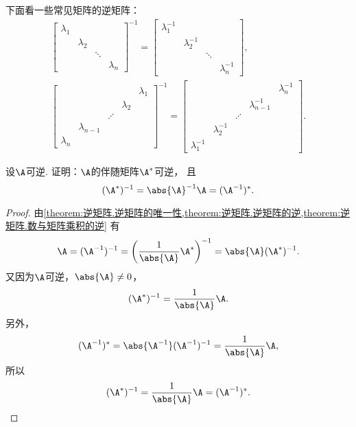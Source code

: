 \begin{example}
下面看一些常见矩阵的逆矩阵：\begin{gather*}
	\begin{bmatrix}
		\lambda_1 \\
		& \lambda_2 \\
		&& \ddots \\
		&&& \lambda_n
	\end{bmatrix}^{-1}
	= \begin{bmatrix}
		\lambda_1^{-1} \\
		& \lambda_2^{-1} \\
		&& \ddots \\
		&&& \lambda_n^{-1}
	\end{bmatrix}, \\
	\begin{bmatrix}
		& & & & \lambda_1 \\
		& & & \lambda_2 \\
		& & \iddots \\
		& \lambda_{n-1} \\
		\lambda_n
	\end{bmatrix}^{-1}
	= \begin{bmatrix}
		& & & & \lambda_n^{-1} \\
		& & & \lambda_{n-1}^{-1} \\
		& & \iddots \\
		& \lambda_2^{-1} \\
		\lambda_1^{-1}
	\end{bmatrix}.
\end{gather*}
\end{example}

\begin{example}\label{theorem:逆矩阵.伴随矩阵的逆与逆矩阵的伴随}
设\(\A\)可逆.
证明：\(\A\)的伴随矩阵\(\A^*\)可逆，
且\begin{equation}
	(\A^*)^{-1}
	= \abs{\A}^{-1} \A
	= (\A^{-1})^*.
\end{equation}
\begin{proof}
由\cref{theorem:逆矩阵.逆矩阵的唯一性,theorem:逆矩阵.逆矩阵的逆,theorem:逆矩阵.数与矩阵乘积的逆} 有\[
	\A
	= (\A^{-1})^{-1}
	= \left( \frac{1}{\abs{\A}} \A^* \right)^{-1}
	= \abs{\A} (\A^*)^{-1}.
\]
又因为\(\A\)可逆，\(\abs{\A}\neq0\)，\[
	(\A^*)^{-1} = \frac{1}{\abs{\A}} \A.
\]
另外，\[
	(\A^{-1})^* = \abs{\A^{-1}} (\A^{-1})^{-1}
	= \frac{1}{\abs{\A}} \A,
\]
所以\[
	(\A^*)^{-1}=\frac{1}{\abs{\A}}\A=(\A^{-1})^*.
	\qedhere
\]
\end{proof}
\end{example}


